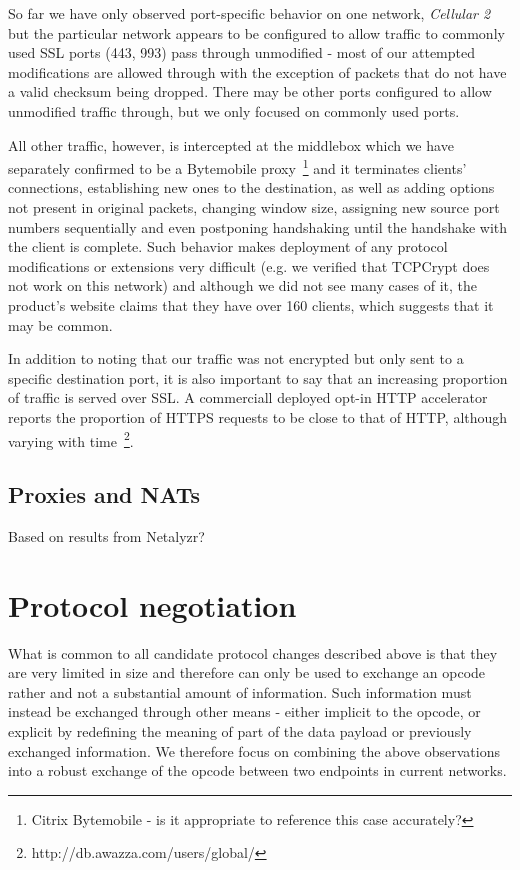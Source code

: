 \documentclass{sig-alternate-10pt}
\begin{document}
So far we have only observed port-specific behavior on one network, \emph{Cellular 2} but the particular network appears to be configured to allow traffic to commonly used SSL ports (443, 993) pass through unmodified - most of our attempted modifications are allowed through with the exception of packets that do not have a valid checksum being dropped. There may be other ports configured to allow unmodified traffic through, but we only focused on commonly used ports.

All other traffic, however, is intercepted at the middlebox which we have separately confirmed to be a Bytemobile proxy~\footnote{Citrix Bytemobile - is it appropriate to reference this case accurately?} and it terminates clients' connections, establishing new ones to the destination, as well as adding options not present in original packets, changing window size, assigning new source port numbers sequentially and even postponing handshaking until the handshake with the client is complete. Such behavior makes deployment of any protocol modifications or extensions very difficult (e.g. we verified that TCPCrypt does not work on this network) and although we did not see many cases of it, the product's website claims that they have over 160 clients, which suggests that it may be common.

In addition to noting that our traffic was not encrypted but only sent to a specific destination port, it is also important to say that an increasing proportion of traffic is served over SSL. A commerciall deployed opt-in HTTP accelerator reports the proportion of HTTPS requests to be close to that of HTTP, although varying with time~\footnote{http://db.awazza.com/users/global/}. 

\subsection{Proxies and NATs}

Based on results from Netalyzr?

\section{Protocol negotiation}

What is common to all candidate protocol changes described above is that they are very limited in size and therefore can only be used to exchange an opcode rather and not a substantial amount of information. Such information must instead be exchanged through other means - either implicit to the opcode, or explicit by redefining the meaning of part of the data payload or previously exchanged information. We therefore focus on combining the above observations into a robust exchange of the opcode between two endpoints in current networks.
\end{document}
